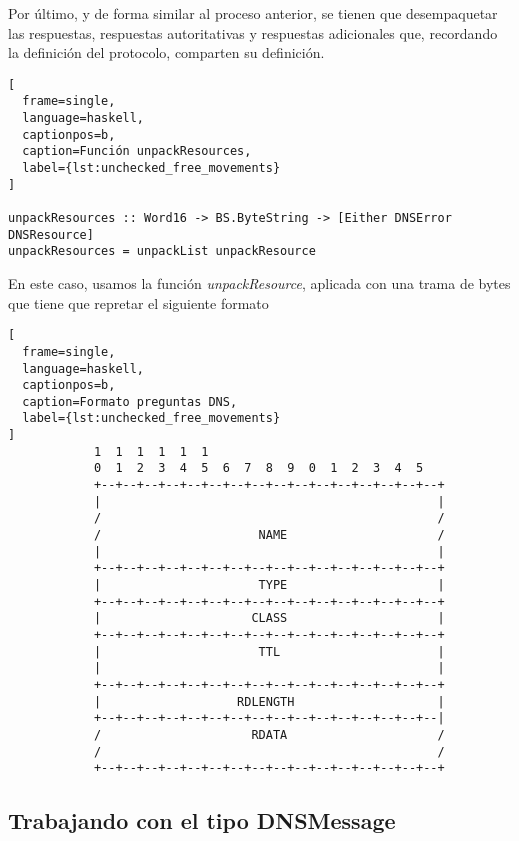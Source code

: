 \documentclass[6pt]{article}
\begin{document}
Por último, y de forma similar al proceso anterior, se tienen que
desempaquetar las respuestas, respuestas autoritativas y respuestas
adicionales que, recordando la definición del protocolo, comparten
su definición.

\begin{lstlisting}[
  frame=single,
  language=haskell,
  captionpos=b,
  caption=Función unpackResources,
  label={lst:unchecked_free_movements}
]

unpackResources :: Word16 -> BS.ByteString -> [Either DNSError DNSResource]
unpackResources = unpackList unpackResource
\end{lstlisting}

En este caso, usamos la función \textit{unpackResource},
aplicada con una trama de bytes que tiene que repretar
el siguiente formato

\clearpage
\begin{lstlisting}[
  frame=single,
  language=haskell,
  captionpos=b,
  caption=Formato preguntas DNS,
  label={lst:unchecked_free_movements}
]
            1  1  1  1  1  1
            0  1  2  3  4  5  6  7  8  9  0  1  2  3  4  5
            +--+--+--+--+--+--+--+--+--+--+--+--+--+--+--+--+
            |                                               |
            /                                               /
            /                      NAME                     /
            |                                               |
            +--+--+--+--+--+--+--+--+--+--+--+--+--+--+--+--+
            |                      TYPE                     |
            +--+--+--+--+--+--+--+--+--+--+--+--+--+--+--+--+
            |                     CLASS                     |
            +--+--+--+--+--+--+--+--+--+--+--+--+--+--+--+--+
            |                      TTL                      |
            |                                               |
            +--+--+--+--+--+--+--+--+--+--+--+--+--+--+--+--+
            |                   RDLENGTH                    |
            +--+--+--+--+--+--+--+--+--+--+--+--+--+--+--+--|
            /                     RDATA                     /
            /                                               /
            +--+--+--+--+--+--+--+--+--+--+--+--+--+--+--+--+
\end{lstlisting}

\subsection{Trabajando con el tipo DNSMessage}
\end{document}
